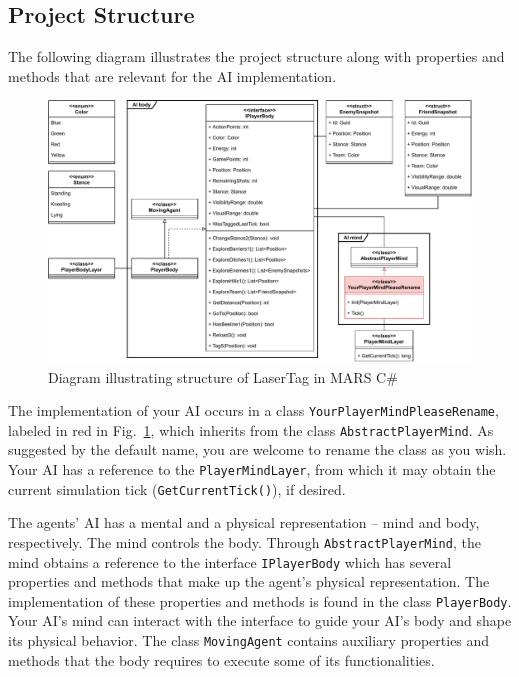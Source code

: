 \documentclass[
    a4paper,
    english,
    DIV=16,
    11pt,
    parskip=half,
    listof=totoc,		%
    index=totoc,		%
    bibliography=totoc,	%
]{scrartcl}
\begin{document}
\subsection{Project Structure}
\label{projStruc}

The following diagram illustrates the project structure along with properties and methods that are relevant for the AI implementation.

\begin{figure}[H]
    \centering
    \includegraphics[width=1.0\textwidth, height=0.5\textheight,keepaspectratio]{img/LaserTagStructure.pdf}
    \caption{Diagram illustrating structure of LaserTag in MARS C\#}
    \label{classdiag}
\end{figure}

The implementation of your AI occurs in a class \texttt{YourPlayerMindPleaseRename}, labeled in red in Fig.~\ref{classdiag}, which inherits from the class \texttt{AbstractPlayerMind}. As suggested by the default name, you are welcome to rename the class as you wish. Your AI has a reference to the \texttt{PlayerMindLayer}, from which it may obtain the current simulation tick (\texttt{GetCurrentTick()}), if desired.

The agents' AI has a mental and a physical representation -- mind and body, respectively. The mind controls the body. Through \texttt{AbstractPlayerMind}, the mind obtains a reference to the interface \texttt{IPlayerBody} which has several properties and methods that make up the agent's physical representation. The implementation of these properties and methods is found in the class \texttt{PlayerBody}. Your AI's mind can interact with the interface to guide your AI's body and shape its physical behavior. The class \texttt{MovingAgent} contains auxiliary properties and methods that the body requires to execute some of its functionalities. 
\end{document}
